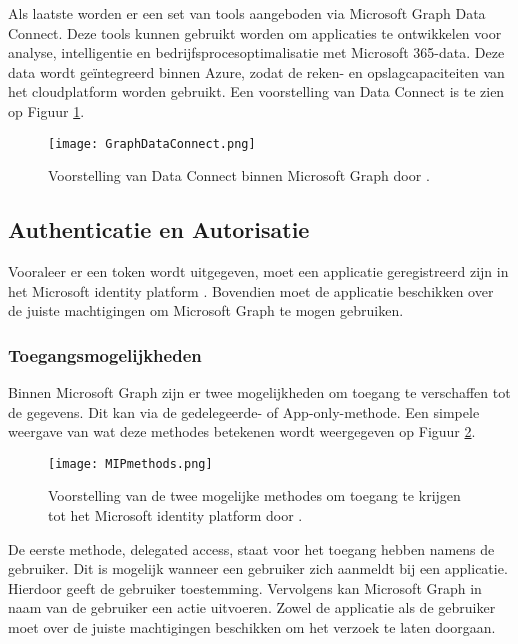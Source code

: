 Als laatste worden er een set van tools aangeboden via Microsoft Graph Data Connect. Deze tools kunnen gebruikt worden om applicaties te ontwikkelen voor analyse, intelligentie en bedrijfsprocesoptimalisatie met Microsoft 365-data. Deze data wordt geïntegreerd binnen Azure, zodat de reken- en opslagcapaciteiten van het cloudplatform worden gebruikt. Een voorstelling van Data Connect is te zien op Figuur \ref{MSGDC}. \\

\begin{figure}[!h]
    \texttt{[image: GraphDataConnect.png]}
    \caption[Voorbeeld Microsoft Graph Data Connect]{Voorstelling van Data Connect binnen Microsoft Graph door \textcite{Microsoft2022c}.}
    \label{MSGDC}
\end{figure}

\subsection{Authenticatie en Autorisatie}

Vooraleer er een token wordt uitgegeven, moet een applicatie geregistreerd zijn in het Microsoft identity platform \autocite{Microsoft2022b}. Bovendien moet de applicatie beschikken over de juiste machtigingen om Microsoft Graph te mogen gebruiken. \\

\subsubsection{Toegangsmogelijkheden}

Binnen Microsoft Graph zijn er twee mogelijkheden om toegang te verschaffen tot de gegevens. Dit kan via de gedelegeerde- of App-only-methode. Een simpele weergave van wat deze methodes betekenen wordt weergegeven op Figuur \ref{MIPM}. \\

\begin{figure}[h]
    \texttt{[image: MIPmethods.png]}
    \caption[Voorbeeld toegangsmogelijkheden]{Voorstelling van de twee mogelijke methodes om toegang te krijgen tot het Microsoft identity platform door \autocite{Microsoft2022b}.}
    \label{MIPM}
\end{figure}

De eerste methode, delegated access, staat voor het toegang hebben namens de gebruiker. Dit is mogelijk wanneer een gebruiker zich aanmeldt bij een applicatie. Hierdoor geeft de gebruiker toestemming. Vervolgens kan Microsoft Graph in naam van de gebruiker een actie uitvoeren. Zowel de applicatie als de gebruiker moet over de juiste machtigingen beschikken om het verzoek te laten doorgaan. \\

